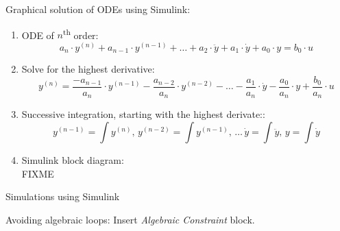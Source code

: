 \documentclass[a4paper,fontsize=11pt,parskip]{scrartcl}
\begin{document}
Graphical solution of ODEs using Simulink:
\begin{enumerate}
	\item ODE of $n$\textsuperscript{th} order: \[a_n\cdot y^{(n)}+a_{n-1}\cdot y^{(n-1)}+\dots+a_2\cdot\ddot y+a_1\cdot\dot y+a_0\cdot y=b_0\cdot u\]
	\item Solve for the highest derivative: \[y^{(n)}=\frac{-a_{n-1}}{a_n}\cdot y^{(n-1)}-\frac{a_{n-2}}{a_n}\cdot y^{(n-2)}-\dots-\frac{a_1}{a_n}\cdot\dot y-\frac{a_0}{a_n}\cdot y+\frac{b_0}{a_n}\cdot u\]
	\item Successive integration, starting with the highest derivate:: \[y^{(n-1)}=\int y^{(n)},\,y^{(n-2)}=\int y^{(n-1)},\,\dots\,\dot y=\int\ddot y,\,y=\int\dot y\]
\item Simulink block diagram:\\ FIXME
\end{enumerate}

{\Large Simulations using Simulink}

Avoiding algebraic loops: Insert \emph{Algebraic Constraint} block.
\end{document}
